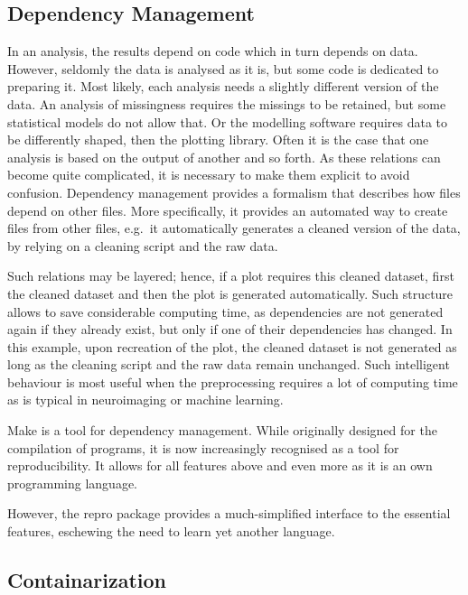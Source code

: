 \documentclass[12pt,a4paper,]{article}
\begin{document}
\hypertarget{dependency-management}{%
\subsection{Dependency Management}\label{dependency-management}}

In an analysis, the results depend on code which in turn depends on data.
However, seldomly the data is analysed as it is, but some code is dedicated to preparing it.
Most likely, each analysis needs a slightly different version of the data.
An analysis of missingness requires the missings to be retained, but some statistical models do not allow that.
Or the modelling software requires data to be differently shaped, then the plotting library.
Often it is the case that one analysis is based on the output of another and so forth.
As these relations can become quite complicated, it is necessary to make them explicit to avoid confusion.
Dependency management provides a formalism that describes how files depend on other files.
More specifically, it provides an automated way to create files from other files, e.g.~it automatically generates a cleaned version of the data, by relying on a cleaning script and the raw data.

Such relations may be layered; hence, if a plot requires this cleaned dataset, first the cleaned dataset and then the plot is generated automatically.
Such structure allows to save considerable computing time, as dependencies are not generated again if they already exist, but only if one of their dependencies has changed.
In this example, upon recreation of the plot, the cleaned dataset is not generated as long as the cleaning script and the raw data remain unchanged.
Such intelligent behaviour is most useful when the preprocessing requires a lot of computing time as is typical in neuroimaging or machine learning.

Make is a tool for dependency management. While originally designed for the compilation of programs, it is now increasingly recognised as a tool for reproducibility.
It allows for all features above and even more as it is an own programming language.

However, the repro package provides a much-simplified interface to the essential features, eschewing the need to learn yet another language.

\hypertarget{containarization}{%
\subsection{Containarization}\label{containarization}}
\end{document}
